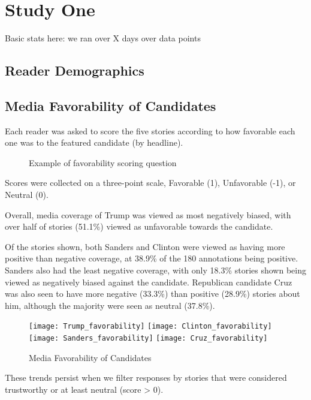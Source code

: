 \chapter{Study One}
Basic stats here:
we ran over X days
over data points

\section{Reader Demographics}

\section{Media Favorability of Candidates}
Each reader was asked to score the five stories according to how favorable each one was to the featured candidate (by headline). 

\begin{figure}[h!] 
\centering
  \caption{Example of favorability scoring question}
\end{figure}
 
Scores were collected on a three-point scale, Favorable (1), Unfavorable (-1), or Neutral (0).

Overall, media coverage of Trump was viewed as most negatively biased, with over half of stories (51.1\%) viewed as unfavorable towards the candidate.

Of the stories shown, both Sanders and Clinton were viewed as having more positive than negative coverage, at 38.9\% of the 180 annotations being positive. Sanders also had the least negative coverage, with only 18.3\% stories shown being viewed as negatively biased against the candidate. Republican candidate Cruz was also seen to have more negative (33.3\%) than positive (28.9\%) stories about him, although the majority were seen as neutral (37.8\%).

\begin{figure}[h!] 
\centering
  \texttt{[image: Trump\_favorability]} 
  \texttt{[image: Clinton\_favorability]} 
  \texttt{[image: Sanders\_favorability]} 
  \texttt{[image: Cruz\_favorability]} 
  \caption{Media Favorability of Candidates}
\end{figure}

These trends persist when we filter responses by stories that were considered trustworthy or at least neutral (score > 0).


